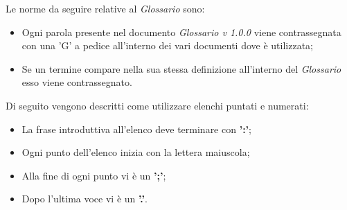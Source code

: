 Le norme da seguire relative al \textit{Glossario} sono:
\begin{itemize}
    \item Ogni parola presente nel documento \textit{Glossario v 1.0.0} viene contrassegnata con una 'G' a pedice all'interno dei vari documenti dove è utilizzata;
    \item Se un termine compare nella sua stessa definizione all'interno del \textit{Glossario } esso viene contrassegnato.
\end{itemize}

 \label{sec:elenchi_puntati_numerati}
Di seguito vengono descritti come utilizzare elenchi puntati e numerati:
\begin{itemize}
\item La frase introduttiva all'elenco deve terminare con \textbf{':'};
\item Ogni punto dell'elenco inizia con la lettera maiuscola;
\item Alla fine di ogni punto vi è un \textbf{';'};
\item Dopo l'ultima voce vi è un \textbf{'.'}.
\end{itemize}

